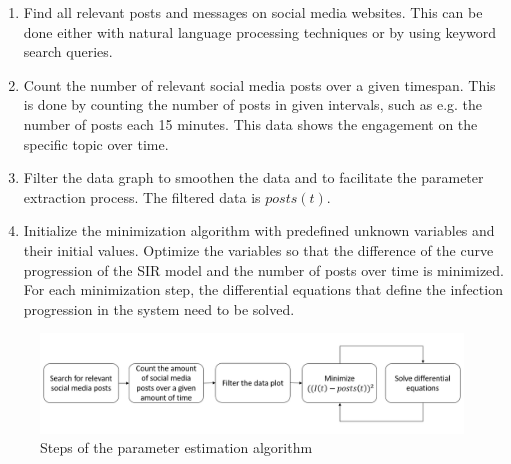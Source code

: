 \begin{enumerate}
    \item Find all relevant posts and messages on social media websites.
    This can be done either with natural language processing techniques or
    by using keyword search queries.
    \item Count the number of relevant social media posts over a given 
    timespan. This is done by counting the number of posts in given intervals, 
    such as e.g. the number of posts each 15 minutes. This data shows the
    engagement on the specific topic over time.
    \item Filter the data graph to smoothen the data and to facilitate the
    parameter extraction process. The filtered data is $posts(t)$.
    \item Initialize the minimization algorithm with predefined unknown
    variables and their initial values. Optimize the variables
    so that the difference of the curve progression of the SIR model
    and the number of posts over time is minimized. For each minimization
    step, the differential equations that define the infection progression
    in the system need to be solved.
\end{enumerate}

\begin{figure}[!ht]
    \center
    \includegraphics[scale=.65]{figs/parameter_estimation_process.png}
    \caption{Steps of the parameter estimation algorithm}
    \label{paramestimationbasic}
\end{figure}

